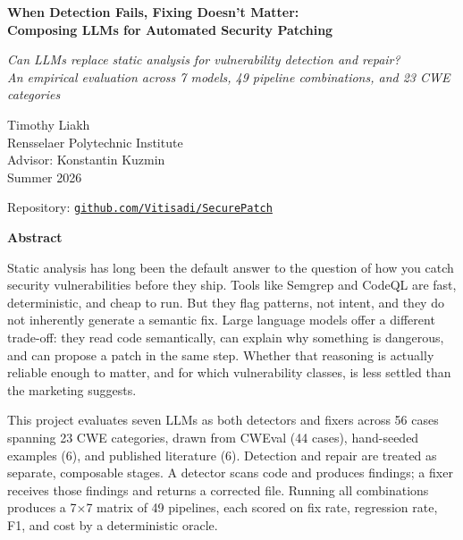 \documentclass[12pt]{article}
\begin{document}
\begin{titlepage}
  \centering
  \vspace*{4cm}

  {\LARGE\bfseries When Detection Fails, Fixing Doesn't Matter:\\[0.4em]
  Composing LLMs for Automated Security Patching\par}

  \vspace{0.5cm}
  {\large\itshape Can LLMs replace static analysis for vulnerability detection and repair?\\[0.2em]
  An empirical evaluation across 7 models, 49 pipeline combinations, and 23 CWE categories\par}

  \vspace{1.2cm}
  {\normalsize
    Timothy Liakh\\[0.15em]
    Rensselaer Polytechnic Institute\\[0.15em]
    Advisor: Konstantin Kuzmin\\[0.15em]
    Summer 2026
  \par}

  \vspace{0.5cm}
  {\normalsize Repository: \href{https://github.com/Vitisadi/SecurePatch}{\texttt{github.com/Vitisadi/SecurePatch}}\par}
\end{titlepage}

\newpage
\begin{center}
  \textbf{Abstract}
\end{center}

Static analysis has long been the default answer to the question of how you
catch security vulnerabilities before they ship. Tools like Semgrep and CodeQL
are fast, deterministic, and cheap to run. But they flag patterns, not intent,
and they do not inherently generate a semantic fix. Large language models offer a different
trade-off: they read code semantically, can explain why something is dangerous,
and can propose a patch in the same step. Whether that reasoning is actually
reliable enough to matter, and for which vulnerability classes, is less settled
than the marketing suggests.

This project evaluates seven LLMs as both detectors and fixers across 56
cases spanning 23 CWE categories, drawn from CWEval (44 cases), hand-seeded
examples (6), and published literature (6). Detection and repair are treated as
separate, composable stages. A detector scans code and produces findings; a
fixer receives those findings and returns a corrected file. Running all
combinations produces a 7$\times$7 matrix of 49 pipelines, each scored on fix
rate, regression rate, F1, and cost by a deterministic oracle.
\end{document}
